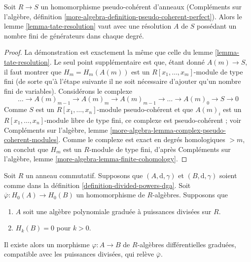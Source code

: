 \begin{lemma}
\label{lemma-tate-resoluton-pseudo-coherent-ring-map}
Soit $R \to S$ un homomorphisme pseudo-cohérent d'anneaux (Compléments sur
l'algèbre, définition
\ref{more-algebra-definition-pseudo-coherent-perfect}). Alors le
lemme \ref{lemma-tate-resolution} vaut avec une résolution $A$ de $S$
possédant un nombre fini de générateurs dans chaque degré.
\end{lemma}

\begin{proof}
La démonstration est exactement la même que celle du
lemme \ref{lemma-tate-resolution}. Le seul point supplémentaire est que,
étant donné $A(m) \to S$, il faut montrer que
$H_m = H_m(A(m))$ est un $R[x_1, \ldots, x_m]$-module de type fini (de sorte
qu'à l'étape suivante il ne soit nécessaire d'ajouter qu'un nombre fini de
variables). Considérons le complexe
$$
\ldots \to A(m)_{m - 1} \to A(m)_m \to A(m)_{m - 1} \to
\ldots \to A(m)_0 \to S \to 0
$$
Comme $S$ est un $R[x_1, \ldots, x_n]$-module pseudo-cohérent et que
$A(m)_i$ est un $R[x_1, \ldots, x_n]$-module libre de type fini, ce complexe
est pseudo-cohérent ; voir Compléments sur l'algèbre, lemme
\ref{more-algebra-lemma-complex-pseudo-coherent-modules}. Comme le complexe
est exact en degrés homologiques $> m$, on conclut que $H_m$ est un
$R$-module de type fini, d'après Compléments sur l'algèbre, lemme
\ref{more-algebra-lemma-finite-cohomology}.
\end{proof}

\begin{lemma}
\label{lemma-uniqueness-tate-resolution}
Soit $R$ un anneau commutatif. Supposons que $(A, \text{d}, \gamma)$ et
$(B, \text{d}, \gamma)$ soient comme dans la définition
\ref{definition-divided-powers-dga}. Soit
$\overline{\varphi} : H_0(A) \to H_0(B)$ un homomorphisme de $R$-algèbres.
Supposons que
\begin{enumerate}
\item $A$ soit une algèbre polynomiale graduée à puissances divisées sur $R$.
\item $H_k(B) = 0$ pour $k > 0$.
\end{enumerate}
Il existe alors un morphisme $\varphi : A \to B$ de $R$-algèbres
différentielles graduées, compatible avec les puissances divisées, qui relève
$\overline{\varphi}$.
\end{lemma}

